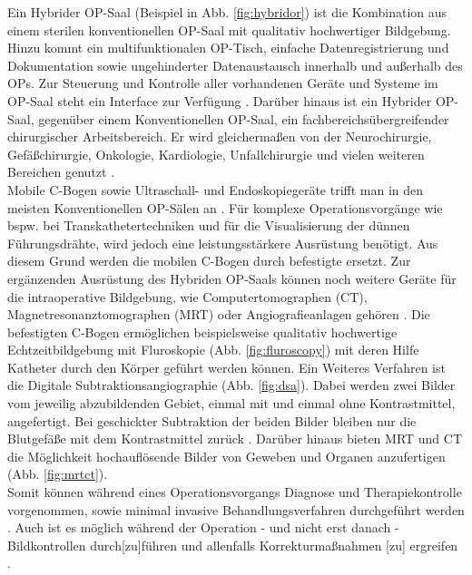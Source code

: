 Ein Hybrider OP-Saal (Beispiel in Abb. \ref{fig:hybridor}) ist die Kombination aus einem sterilen konventionellen OP-Saal mit qualitativ hochwertiger Bildgebung. Hinzu kommt ein multifunktionalen OP-Tisch, einfache Datenregistrierung und Dokumentation sowie ungehinderter Datenaustausch innerhalb und außerhalb des OPs. Zur Steuerung und Kontrolle aller vorhandenen Geräte und Systeme im OP-Saal steht ein Interface zur Verfügung \cite{HybriderVsKonventioneller,KarlStorz}. Darüber hinaus ist ein Hybrider OP-Saal, gegenüber einem Konventionellen OP-Saal, ein fachbereichsübergreifender chirurgischer Arbeitsbereich. Er wird gleichermaßen von der Neurochirurgie, Gefäßchirurgie, Onkologie, Kardiologie, Unfallchirurgie und vielen weiteren Bereichen genutzt \cite{Getinge}.\\
Mobile C-Bogen sowie Ultraschall- und Endoskopiegeräte trifft man in den meisten Konventionellen OP-Sälen an \cite{TechnicalConsiderations}. Für komplexe Operationsvorgänge wie bspw. bei Transkathetertechniken und für die Visualisierung der dünnen Führungsdrähte, wird jedoch eine leistungsstärkere Ausrüstung benötigt. Aus diesem Grund werden die mobilen C-Bogen durch befestigte ersetzt. Zur ergänzenden Ausrüstung des Hybriden OP-Saals können noch weitere Geräte für die intraoperative Bildgebung, wie Computertomographen (CT), Magnetresonanztomographen (MRT) oder Angiografieanlagen gehören \cite{OPderZukunft}. 
Die befestigten C-Bogen ermöglichen beispielsweise qualitativ hochwertige Echtzeitbildgebung mit Fluroskopie (Abb. \ref{fig:fluroscopy}) mit deren Hilfe Katheter durch den Körper geführt werden können. Ein Weiteres Verfahren ist die Digitale Subtraktionsangiographie (Abb. \ref{fig:dsa}). Dabei werden zwei Bilder vom jeweilig abzubildenden Gebiet, einmal mit und einmal ohne Kontrastmittel, angefertigt. Bei geschickter Subtraktion der beiden Bilder bleiben nur die Blutgefäße mit dem Kontrastmittel zurück \cite{CurrentAndFuture}. Darüber hinaus bieten MRT und CT die Möglichkeit hochauflösende Bilder von Geweben und Organen anzufertigen (Abb. \ref{fig:mrtct}).\\
Somit können während eines Operationsvorgangs Diagnose und Therapiekontrolle vorgenommen, sowie minimal invasive Behandlungsverfahren durchgeführt werden \cite{SHG-Kliniken}. Auch ist es möglich \glqq während der Operation - und nicht erst danach - Bildkontrollen durch[zu]führen und allenfalls Korrekturmaßnahmen [zu] ergreifen\grqq{} \cite{OPderZukunft}. 

